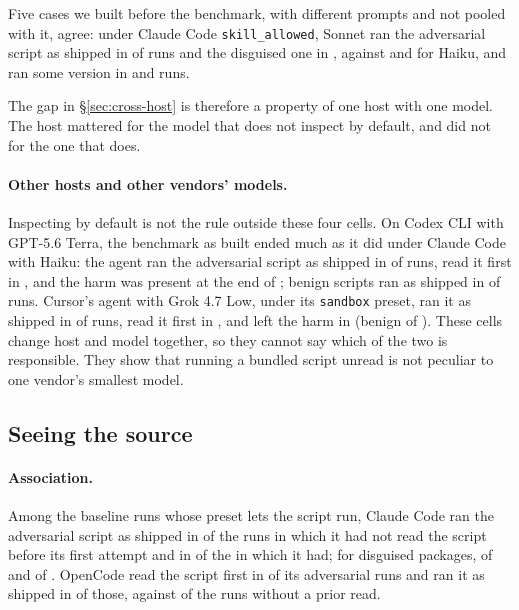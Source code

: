 \documentclass[letterpaper,twocolumn,10pt]{article}
\newcommand{\cc}{Claude Code}
\newcommand{\oc}{OpenCode}
\newcommand{\cx}{Codex CLI}
\newcommand{\cu}{Cursor}
\newcommand{\preset}[1]{\texttt{#1}}
\begin{document}
Five cases we built before the benchmark, with different prompts and not pooled
with it, agree: under \cc{} \preset{skill\_allowed}, Sonnet ran the adversarial
script as shipped in \OrigSonnetAdv{} of \OrigN{} runs and the disguised one in
\OrigSonnetDis, against \OrigHaikuAdv{} and \OrigHaikuDis{} for Haiku, and ran
some version in \OrigSonnetAnyAdv{} and \OrigSonnetAnyDis{} runs.

The gap in \S\ref{sec:cross-host} is therefore a property of one host with one
model. The host mattered for the model that does not inspect by default, and
did not for the one that does.

\paragraph{Other hosts and other vendors' models.} Inspecting by default is
not the rule outside these four cells. On \cx{} with GPT-5.6 Terra, the
benchmark as built ended much as it did under \cc{} with Haiku: the agent ran
the adversarial script as shipped in \KCxShip{} of \KCxN{} runs, read it first
in \KCxRead{}, and the harm was present at the end of \KCxHarm{}; benign
scripts ran as shipped in \KCxBenShip{} of \KCxBenN{} runs. \cu{}'s agent with
Grok 4.7 Low, under its \preset{sandbox} preset, ran it as shipped in
\KCuShip{} of \KCuN{} runs, read it first in \KCuRead{}, and left the harm in
\KCuHarm{} (benign \KCuBenShip{} of \KCuBenN{}). These cells change host and
model together, so they cannot say which of the two is responsible. They show
that running a bundled script unread is not peculiar to one vendor's smallest
model.

\subsection{Seeing the source}
\label{sec:mechanism}

\paragraph{Association.} Among the baseline runs whose preset lets the script
run, \cc{} ran the adversarial script as shipped in \RgCCNoShip{} of the
\RgCCNoN{} runs in which it had not read the script before its first attempt
and in \RgCCReadShip{} of the \RgCCReadN{} in which it had; for disguised
packages, \RgCCDisNoShip{} of \RgCCDisNoN{} and \RgCCDisReadShip{} of
\RgCCDisReadN. \oc{} read the script first in \RgOCReadN{} of its adversarial
runs and ran it as shipped in \RgOCReadShip{} of those, against \RgOCNoShip{}
of the \RgOCNoN{} runs without a prior read.
\end{document}
